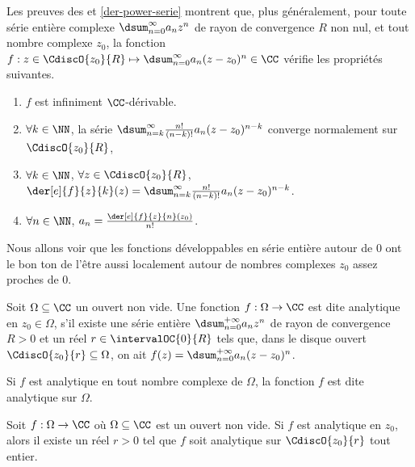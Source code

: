 \begin{remark} \label{der-power-serie-gene}
	Les preuves des  et \ref{der-power-serie} montrent que, plus généralement,
	pour toute série entière complexe $\dsum_{n=0}^{\infty} a_n z^n$ de rayon de convergence $R$ non nul,
	et tout nombre complexe $z_0$,
	la fonction $f: z \in \CdiscO{z_0}{R} \mapsto \dsum_{n=0}^{\infty} a_n (z - z_0)^n \in \CC$ vérifie les propriétés suivantes.
    \begin{enumerate}
    	\item $f$ est infiniment $\CC$-dérivable.

    	\item $\forall k \in \NN$,
		la série $\dsum_{n = k}^{\infty} \frac{n!}{(n-k)!} a_n (z - z_0)^{n - k}$ converge normalement sur $\CdiscO{z_0}{R}$,

    	\item $\forall k \in \NN$, $\forall z \in \CdiscO{z_0}{R}$,
		$\der[e]{f}{z}{k}(z) = \dsum_{n = k}^{\infty} \frac{n!}{(n-k)!} a_n (z - z_0)^{n - k}$.

    	\item $\forall n \in \NN$, $a_n = \frac{\der[e]{f}{z}{n}(z_0)}{n!}$.
    \end{enumerate}
\end{remark}




Nous allons voir que les fonctions développables en série entière autour de $0$ ont le bon ton de l'être aussi localement autour de nombres complexes $z_0$ assez proches de $0$.


\begin{defi} \label{def-analytic}
    Soit $\Omega \subseteq \CC$ un ouvert non vide.
	Une fonction $f: \Omega \rightarrow \CC$ est dite analytique en $z_0 \in \Omega$, 
	s'il existe
	une série entière $\dsum_{n = 0}^{+\infty} a_n z^n$
	de rayon de convergence $R > 0$
	et
	un réel $r \in \intervalOC{0}{R}$ tels que,
	dans le disque ouvert $\CdiscO{z_0}{r} \subseteq \Omega$,
	on ait
	$f(z) = \dsum_{n = 0}^{+\infty} a_n (z - z_0)^n$.

	\smallskip
	
	Si $f$ est analytique en tout nombre complexe de $\Omega$,
	la fonction $f$ est dite analytique sur $\Omega$.
\end{defi}




\begin{fact} \label{power-serie-vs-analytic}
    Soit $f: \Omega \rightarrow \CC$ où $\Omega \subseteq \CC$ est un ouvert non vide.
    Si $f$ est analytique en $z_0$,
	alors
	il existe un réel $r > 0$ tel que $f$ soit analytique sur $\CdiscO{z_0}{r}$ tout entier. 
\end{fact}


